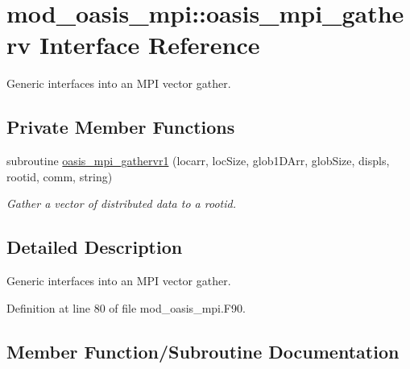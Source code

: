 \hypertarget{interfacemod__oasis__mpi_1_1oasis__mpi__gatherv}{}\section{mod\+\_\+oasis\+\_\+mpi\+:\+:oasis\+\_\+mpi\+\_\+gatherv Interface Reference}
\label{interfacemod__oasis__mpi_1_1oasis__mpi__gatherv}


Generic interfaces into an M\+PI vector gather.  


\subsection*{Private Member Functions}
\begin{DoxyCompactItemize}
\item 
subroutine \hyperlink{interfacemod__oasis__mpi_1_1oasis__mpi__gatherv_a8d17b5a337d8ebec5160dfb891c6a715}{oasis\+\_\+mpi\+\_\+gathervr1} (locarr, loc\+Size, glob1\+D\+Arr, glob\+Size, displs, rootid, comm, string)
\begin{DoxyCompactList}\small\item\em Gather a vector of distributed data to a rootid. \end{DoxyCompactList}\end{DoxyCompactItemize}


\subsection{Detailed Description}
Generic interfaces into an M\+PI vector gather. 

Definition at line 80 of file mod\+\_\+oasis\+\_\+mpi.\+F90.



\subsection{Member Function/\+Subroutine Documentation}
\mbox{\label{interfacemod__oasis__mpi_1_1oasis__mpi__gatherv_a8d17b5a337d8ebec5160dfb891c6a715}} 

